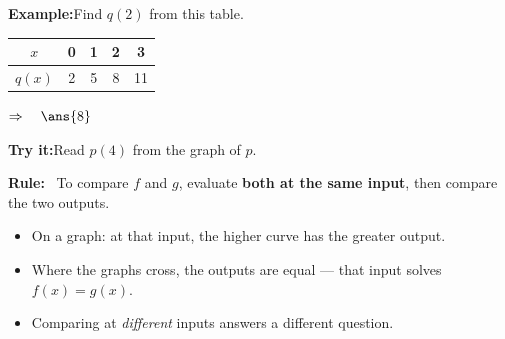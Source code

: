 \documentclass[12pt]{article}
\begin{document}
\begin{examplebox}
\textbf{Example:}\quad Find $q(2)$ from this table.
\par
\begin{center}\small
\begin{tabular}{|c|c|c|c|c|}\hline
$x$ & 0 & 1 & 2 & 3 \\\hline
$q(x)$ & 2 & 5 & 8 & 11 \\\hline
\end{tabular}
\end{center}
$\Rightarrow\quad \ans{8}$
\end{examplebox}

\begin{tryitbox}
\textbf{Try it:}\quad Read $p(4)$ from the graph of $p$.
\par
\begin{center}
\end{center}
\end{tryitbox}


\begin{formulabox}
\textbf{Rule:} \ To compare $f$ and $g$, evaluate \textbf{both at the same input},
then compare the two outputs.
\begin{itemize}[leftmargin=0.8cm, itemsep=1pt, topsep=2pt]
  \item On a graph: at that input, the higher curve has the greater output.
  \item Where the graphs cross, the outputs are equal --- that input solves
        $f(x) = g(x)$.
  \item Comparing at \emph{different} inputs answers a different question.
\end{itemize}
\end{formulabox}
\end{document}

